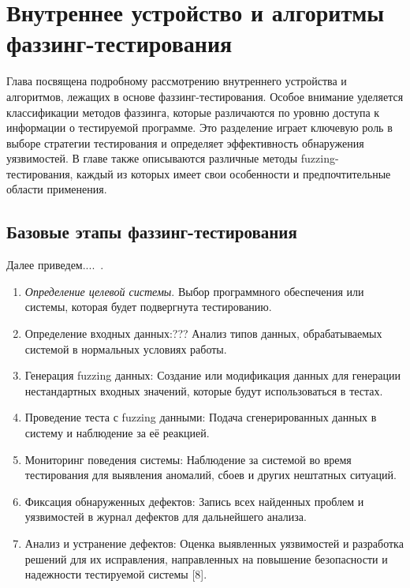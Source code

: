 \chapter{Внутреннее устройство и алгоритмы фаззинг-тестирования} \label{ch2}
	

%
Глава посвящена подробному рассмотрению внутреннего устройства и алгоритмов, лежащих в основе фаззинг-тестирования. Особое внимание уделяется классификации методов фаззинга, которые различаются по уровню доступа к информации о тестируемой программе. Это разделение играет ключевую роль в выборе стратегии тестирования и определяет эффективность обнаружения уязвимостей. В главе также описываются различные методы fuzzing-тестирования, каждый из которых имеет свои особенности и предпочтительные области применения.


\section{Базовые этапы фаззинг-тестирования} \label{ch2:title-abbr} %

Далее приведем....~\cite{???}.
\begin{enumerate}[label=\arabic*.]
	\item \textit{Определение целевой системы}. Выбор программного обеспечения или системы, которая будет подвергнута тестированию. %
	\item Определение входных данных:??? Анализ типов данных, обрабатываемых системой в нормальных условиях работы.
	\item Генерация fuzzing данных: Создание или модификация данных для генерации нестандартных входных значений, которые будут использоваться в тестах.
	\item Проведение теста с fuzzing данными: Подача сгенерированных данных в систему и наблюдение за её реакцией.
	\item Мониторинг поведения системы: Наблюдение за системой во время тестирования для выявления аномалий, сбоев и других нештатных ситуаций.
	\item Фиксация обнаруженных дефектов: Запись всех найденных проблем и уязвимостей в журнал дефектов для дальнейшего анализа.
	\item Анализ и устранение дефектов: Оценка выявленных уязвимостей и разработка решений для их исправления, направленных на повышение безопасности и надежности тестируемой системы [8].
\end{enumerate}

